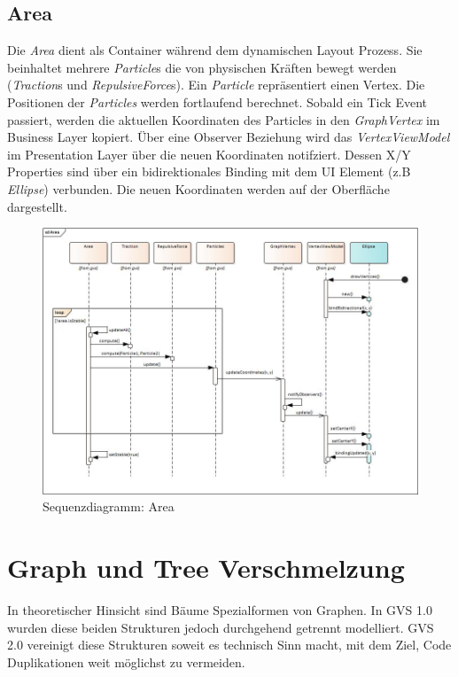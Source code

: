 \documentclass[11pt,a4paper,english,oneside]{book}
\numberwithin{equation}{chapter}
\begin{document}
	\subsection{Area} \label{ssec:area}
	Die \textit{Area} dient als Container während dem dynamischen Layout Prozess. Sie beinhaltet mehrere \textit{Particle}s die von physischen Kräften bewegt werden (\textit{Traction}s und \textit{RepulsiveForce}s). Ein \textit{Particle} repräsentiert einen Vertex. Die Positionen der \textit{Particles} werden fortlaufend berechnet. Sobald ein Tick Event passiert, werden die aktuellen Koordinaten des Particles in den \textit{GraphVertex} im Business Layer kopiert. Über eine Observer Beziehung wird das \textit{VertexViewModel} im Presentation Layer über die neuen Koordinaten notifziert. Dessen X/Y Properties sind über ein bidirektionales Binding mit dem UI Element (z.B \textit{Ellipse}) verbunden. Die neuen Koordinaten werden auf der Oberfläche dargestellt. 
	
	\begin{figure}[h!]
		\centering
		\includegraphics[width=\linewidth]{assets/images/sequence_area}
		\caption{Sequenzdiagramm: Area}
		\label{fig:sequencearea}
	\end{figure}

	\clearpage

	\section{Graph und Tree Verschmelzung} \label{graph-vs-tree}
	In theoretischer Hinsicht sind Bäume Spezialformen von Graphen. In GVS 1.0 wurden diese beiden Strukturen jedoch durchgehend getrennt modelliert. GVS 2.0 vereinigt diese Strukturen soweit es technisch Sinn macht, mit dem Ziel, Code Duplikationen weit möglichst zu vermeiden.
	
\end{document}
